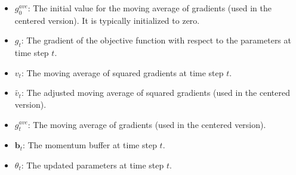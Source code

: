 \documentclass{article}
\begin{document}
\begin{itemize}
    \item \(g^{ave}_0\): The initial value for the moving average of gradients (used in the centered version). It is typically initialized to zero.
    
    \item \(g_t\): The gradient of the objective function with respect to the parameters at time step \(t\).
    
    \item \(v_t\): The moving average of squared gradients at time step \(t\).
    
    \item \(\tilde{v_t}\): The adjusted moving average of squared gradients (used in the centered version).
    
    \item \(g^{ave}_t\): The moving average of gradients (used in the centered version).
    
    \item \(\textbf{b}_t\): The momentum buffer at time step \(t\).
    
    \item \(\theta_t\): The updated parameters at time step \(t\).
\end{itemize}
\end{document}
